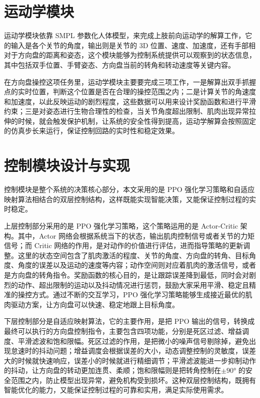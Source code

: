 \section{运动学模块}
运动学模块依靠 SMPL 参数化人体模型，来完成上肢前向运动学的解算工作，它的输入是各个关节的角度，输出则是关节的 3D 位置、速度、加速度，还有手部相对于方向盘的距离和姿态，这个模块能够为控制系统提供可以观察到的状态信息，其中包括双手位置、手臂姿态、方向盘当前的转角和转动速度等关键内容。

在方向盘操控这项任务里，运动学模块主要要完成三项工作，一是解算出双手抓握点的实时位置，判断这个位置是否在合理的操控范围之内；二是计算关节的角速度和加速度，以此反映运动的剧烈程度，这些数据可以用来设计奖励函数和进行平滑约束；三是对姿态进行生物合理性的检查，当关节角度超出限制、肌肉出现异常拉伸的时候，就会触发保护机制，让系统的安全性得到提高，运动学解算会按照固定的仿真步长来运行，保证控制回路的实时性和稳定效果。
\section{控制模块设计与实现}
控制模块是整个系统的决策核心部分，本文采用的是 PPO 强化学习策略和自适应映射算法相结合的双层控制结构，这样既能实现智能决策，又能保证控制过程的实时稳定。

上层控制部分采用的是 PPO 强化学习策略，这个策略运用的是 Actor-Critic 架构。其中，Actor 网络会根据系统当下的状态，输出肌肉控制信号或者关节的力矩信号；而 Critic 网络的作用，是对动作的价值进行评估，进而指导策略的更新调整。这里的状态空间包含了肌肉激活的程度、关节的角度、方向盘的转角、目标角度、角度的误差以及运动的速度等内容；动作空间则对应着肌肉的激活信号，或者是方向盘的转角指令。奖励函数的核心目的，是让跟踪误差降到最低，同时会对剧烈的动作、超出限制的运动以及抖动情况进行惩罚，鼓励大家采用平滑、稳定且精准的操控方式。通过不断的交互学习，PPO 强化学习策略能够生成接近最优的肌肉驱动方案，让方向盘可以快速、稳定地跟上目标角度。

下层控制部分是自适应映射算法，它的主要作用，是把 PPO 输出的信号，转换成最终可以执行的方向盘控制指令，主要包含四项功能，分别是死区过滤、增益调度、平滑滤波和饱和限幅。死区过滤的作用，是把微小的噪声信号剔除掉，避免出现怠速时的抖动问题；增益调度会根据误差的大小，动态调整控制的灵敏度，误差大的时候就快速响应，误差小的时候就进行精细调节；平滑滤波能进一步抑制动作的抖动，让方向盘的转动更加连贯、柔顺；饱和限幅则是把转角控制在$ ±90° $ 的安全范围之内，防止模型出现异常，避免机构受到损坏。这种双层控制结构，既拥有智能优化的能力，又能保证控制过程的可靠和实用，满足实际使用需求。
